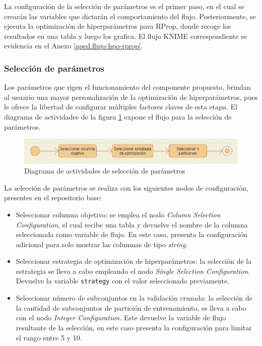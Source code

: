 La configuración de la selección de parámetros es el primer paso, en el cual se crearán las variables que dictarán el comportamiento del flujo. Posteriormente, se ejecuta la optimización de hiperparámetros para RProp, donde recoge los resultados en una tabla y luego los grafica. El flujo KNIME correspondiente se evidencia en el Anexo \ref{aped.flujo-hpo-rprop}.

\subsubsection{Selección de parámetros}
Los parámetros que rigen el funcionamiento del componente propuesto, brindan al usuario una mayor personalización de la optimización de hiperparámetros, pues le ofrece la libertad de configurar múltiples factores claves de esta etapa. El diagrama de actividades de la figura \ref{fig:diagrama-act-selecc-param-hpo} expone el flujo para la selección de parámetros.

\begin{figure}[H]
	\centering
	\includegraphics[width=0.7\linewidth]{"figuras/capi 2/diagrama-act-selecc-param-hpo"}
	\caption[Diagrama de actividades de selección de parámetros]{Diagrama de actividades de selección de parámetros}
	\label{fig:diagrama-act-selecc-param-hpo}
\end{figure}

La selección de parámetros se realiza con los siguientes nodos de configuración, presentes en el repositorio base:

\begin{itemize}
	\item Seleccionar columna objetivo: se emplea el nodo \textit{Column Selection Configuration}, el cual recibe una tabla y devuelve el nombre de la columna seleccionada como variable de flujo. En este caso, presenta la configuración adicional para solo mostrar las columnas de tipo \textit{string}.
	\item Seleccionar estrategia de optimización de hiperparámetros: la selección de la estrategia se lleva a cabo empleando el nodo \textit{Single Selection Configuration}. Devuelve la variable \texttt{strategy} con el valor seleccionado previamente.
	\item Seleccionar número de subconjuntos en la validación cruzada: la selección de la cantidad de subconjuntos de partición de entrenamiento, se lleva a cabo con el nodo \textit{Integer Configuration}. Este devuelve la variable de flujo resultante de la selección, en este caso presenta la configuración para limitar el rango entre 5 y 10.
\end{itemize}

